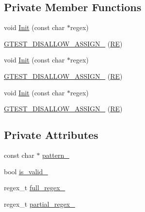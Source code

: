 \subsection*{Private Member Functions}
\begin{DoxyCompactItemize}
\item 
void \mbox{\hyperlink{classtesting_1_1internal_1_1_r_e_a4c3a519ce849abc57d6d5fffbf1e04dc}{Init}} (const char $\ast$regex)
\item 
\mbox{\hyperlink{classtesting_1_1internal_1_1_r_e_a6a07573fee776f88fe045d067dbebe18}{G\+T\+E\+S\+T\+\_\+\+D\+I\+S\+A\+L\+L\+O\+W\+\_\+\+A\+S\+S\+I\+G\+N\+\_\+}} (\mbox{\hyperlink{classtesting_1_1internal_1_1_r_e}{RE}})
\item 
void \mbox{\hyperlink{classtesting_1_1internal_1_1_r_e_a4c3a519ce849abc57d6d5fffbf1e04dc}{Init}} (const char $\ast$regex)
\item 
\mbox{\hyperlink{classtesting_1_1internal_1_1_r_e_a6a07573fee776f88fe045d067dbebe18}{G\+T\+E\+S\+T\+\_\+\+D\+I\+S\+A\+L\+L\+O\+W\+\_\+\+A\+S\+S\+I\+G\+N\+\_\+}} (\mbox{\hyperlink{classtesting_1_1internal_1_1_r_e}{RE}})
\item 
void \mbox{\hyperlink{classtesting_1_1internal_1_1_r_e_a4c3a519ce849abc57d6d5fffbf1e04dc}{Init}} (const char $\ast$regex)
\item 
\mbox{\hyperlink{classtesting_1_1internal_1_1_r_e_a6a07573fee776f88fe045d067dbebe18}{G\+T\+E\+S\+T\+\_\+\+D\+I\+S\+A\+L\+L\+O\+W\+\_\+\+A\+S\+S\+I\+G\+N\+\_\+}} (\mbox{\hyperlink{classtesting_1_1internal_1_1_r_e}{RE}})
\end{DoxyCompactItemize}
\subsection*{Private Attributes}
\begin{DoxyCompactItemize}
\item 
const char $\ast$ \mbox{\hyperlink{classtesting_1_1internal_1_1_r_e_a45d8a808d19f22e6bff42f57ae6c9152}{pattern\+\_\+}}
\item 
bool \mbox{\hyperlink{classtesting_1_1internal_1_1_r_e_af9062fefab96529ff785f50097416d64}{is\+\_\+valid\+\_\+}}
\item 
regex\+\_\+t \mbox{\hyperlink{classtesting_1_1internal_1_1_r_e_a1627cf3c6e38a83518e7aefd659b938b}{full\+\_\+regex\+\_\+}}
\item 
regex\+\_\+t \mbox{\hyperlink{classtesting_1_1internal_1_1_r_e_a1b3e42916c61db479ae90c7a96c22a58}{partial\+\_\+regex\+\_\+}}
\end{DoxyCompactItemize}


